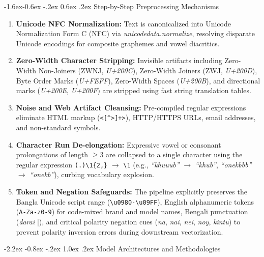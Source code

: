 \documentclass[12pt,a4paper]{article}
\makeatletter
\renewcommand{\texttt}[1]{\textit{#1}}
\renewcommand{\section}{\@startsection{section}{1}{\z@}%
  {-2.2ex \@plus -0.8ex \@minus -.2ex}%
  {1.0ex \@plus.2ex}%
  {\normalfont\LARGE\bfseries}}
\renewcommand{\subsection}{\@startsection{subsection}{2}{\z@}%
  {-1.6ex\@plus -0.6ex \@minus -.2ex}%
  {0.6ex \@plus .2ex}%
  {\normalfont\Large\bfseries}}
\makeatother
\begin{document}
\subsection{Step-by-Step Preprocessing Mechanisms}
\begin{enumerate}
    \item \textbf{Unicode NFC Normalization:} Text is canonicalized into Unicode Normalization Form C (NFC) via \texttt{unicodedata.normalize}, resolving disparate Unicode encodings for composite graphemes and vowel diacritics.
    
    \item \textbf{Zero-Width Character Stripping:} Invisible artifacts including Zero-Width Non-Joiners (ZWNJ, \textit{U+200C}), Zero-Width Joiners (ZWJ, \textit{U+200D}), Byte Order Marks (\textit{U+FEFF}), Zero-Width Spaces (\textit{U+200B}), and directional marks (\textit{U+200E}, \textit{U+200F}) are stripped using fast string translation tables.

    \item \textbf{Noise and Web Artifact Cleansing:} Pre-compiled regular expressions eliminate HTML markup (\verb|<[^>]+>|), HTTP/HTTPS URLs, email addresses, and non-standard symbols.
    
    \item \textbf{Character Run De-elongation:} Expressive vowel or consonant prolongations of length $\ge 3$ are collapsed to a single character using the regular expression \verb|(.)\1{2,}| $\to$ \verb|\1| (e.g., \textit{``khuuub''} $\to$ \textit{``khub''}, \textit{``onekbbb''} $\to$ \textit{``onekb''}), curbing vocabulary explosion.

    \item \textbf{Token and Negation Safeguards:} The pipeline explicitly preserves the Bangla Unicode script range (\verb|\u0980-\u09FF|), English alphanumeric tokens (\verb|A-Za-z0-9|) for code-mixed brand and model names, Bengali punctuation (\textit{darai} \verb|||), and critical polarity negation cues (\textit{na}, \textit{nai}, \textit{nei}, \textit{noy}, \textit{kintu}) to prevent polarity inversion errors during downstream vectorization.
\end{enumerate}

\section{Model Architectures and Methodologies}
\label{sec:models}
\end{document}
